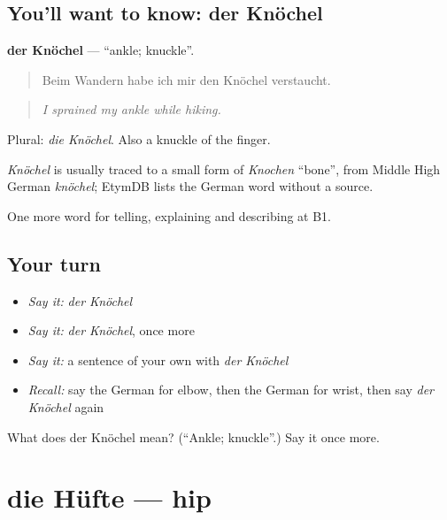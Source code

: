 \subsection*{You'll want to know: der Knöchel}
\textbf{der Knöchel} — \textquotedblleft{}ankle; knuckle\textquotedblright{}.

\begin{quote}
Beim Wandern habe ich mir den Knöchel verstaucht.
\end{quote}

\begin{quote}
\emph{I sprained my ankle while hiking.}
\end{quote}

Plural: \emph{die Knöchel}. Also a knuckle of the finger.

\begin{cousinweb}
\emph{Knöchel} is usually traced to a small form of \emph{Knochen} \textquotedblleft{}bone\textquotedblright{}, from Middle High German \emph{knöchel}; EtymDB lists the German word without a source.
\end{cousinweb}

\begin{grammarlens}[title={What you've built}]
One more word for telling, explaining and describing at B1.
\end{grammarlens}

\subsection*{Your turn}
\begin{itemize}
\raggedright
  \item \emph{Say it:} \emph{der Knöchel}
  \item \emph{Say it:} \emph{der Knöchel}, once more
  \item \emph{Say it:} a sentence of your own with \emph{der Knöchel}
  \item \emph{Recall:} say the German for elbow, then the German for wrist, then say \emph{der Knöchel} again
\end{itemize}

\begin{tcolorbox}[breakable,colback=teal!4,colframe=teal!35!black,title={Before you move on}]
What does der Knöchel mean? (\textquotedblleft{}Ankle; knuckle\textquotedblright{}.) Say it once more.
\end{tcolorbox}
\section[die Hüfte]{die Hüfte — hip}

